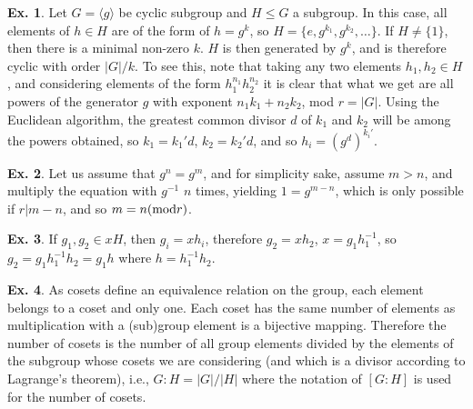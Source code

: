\documentclass[a4paper,12pt]{article}
\theoremstyle{definition}
\newtheorem{exercise}{Ex.}[section]
\begin{document}
\begin{exercise}
 Let $G=\langle g\rangle$ be cyclic subgroup and $H\le G$ a subgroup. In this case, all elements of $h\in H$ are of the form of $h=g^k$, so $H=\{e, g^{k_1}, g^{k_2}, \dots\}$. If $H\ne \{1\}$, then there is a minimal non-zero $k$. $H$ is then generated by $g^k$, and is therefore cyclic with order $|G|/k$. To see this, note that taking any two elements $h_1, h_2 \in H$, and considering elements of the form $h_1^{n_1} h_2^{n_2}$ it is clear that what we get are all powers of the generator $g$ with exponent $n_1 k_1 + n_2 k_2$, mod $r=|G|$. Using the Euclidean algorithm, the greatest common divisor $d$ of $k_1$ and $k_2$ will be among the powers obtained, so $k_1=k_1' d$, $k_2=k_2' d$, and so $h_i= (g^d)^{k_i'}$.
\end{exercise}


\begin{exercise}
 Let us assume that $g^n=g^m$, and for simplicity sake, assume $m>n$, and multiply the equation with $g^{-1}$ $n$ times, yielding $1=g^{m-n}$, which is only possible if $r|m-n$, and so $m=n({\rm mod} r)$.
\end{exercise}

\begin{exercise}
 If $g_1, g_2 \in xH$, then $g_i=xh_i$, therefore $g_2 = xh_2$, $x=g_1h_1^{-1}$, so $g_2=g_1 h_1^{-1} h_2=g_1 h$ where $h=h_1^{-1}h_2$.
\end{exercise}

\begin{exercise}
 As cosets define an equivalence relation on the group, each element belongs to a coset and only one. Each coset has the same number of elements as multiplication with a (sub)group element is a bijective mapping. Therefore the number of cosets is the number of all group elements divided by the elements of the subgroup whose cosets we are considering (and which is a divisor according to Lagrange's theorem), i.e., $G:H = |G|/|H|$ where the notation of $[G:H]$ is used for the number of cosets.
\end{exercise}
\end{document}
